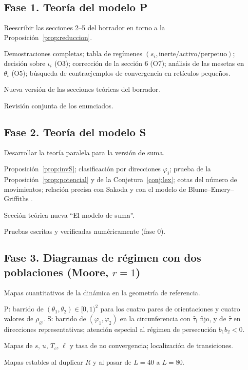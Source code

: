 \documentclass[11pt,a4paper]{article}
\theoremstyle{plain}
\theoremstyle{definition}
\theoremstyle{remark}
\newcommand{\vac}{\varnothing}
\newcommand{\modP}{\textsf{P}}
\newcommand{\modS}{\textsf{S}}
\newenvironment{fase}[1]{\subsection*{#1}\begin{description}[leftmargin=0pt,itemsep=2pt]}{\end{description}}
\begin{document}
\begin{fase}{Fase 1. Teoría del modelo \modP}
\item[Objetivo.] Reescribir las secciones 2--5 del borrador en torno a la
Proposición~\ref{prop:reduccion}.
\item[Tareas.] Demostraciones completas; tabla de regímenes
$(s_i,\text{inerte/activo/perpetuo})$; decisión sobre $\iota_i$ (O3); corrección
de la sección 6 (O7); análisis de las mesetas en $\theta_i$ (O5); búsqueda de
contraejemplos de convergencia en retículos pequeños.
\item[Entregable.] Nueva versión de las secciones teóricas del borrador.
\item[Cierre.] Revisión conjunta de los enunciados.
\end{fase}

\begin{fase}{Fase 2. Teoría del modelo \modS}
\item[Objetivo.] Desarrollar la teoría paralela para la versión de suma.
\item[Tareas.] Proposición~\ref{prop:invS}; clasificación por direcciones
$\varphi_i$; prueba de la Proposición~\ref{prop:potencial} y de la
Conjetura~\ref{conj:lex}; cotas del número de movimientos; relación precisa con
Sakoda \cite{Goles2017} y con el modelo de Blume--Emery--Griffiths
\cite{BEG1971}.
\item[Entregable.] Sección teórica nueva ``El modelo de suma''.
\item[Cierre.] Pruebas escritas y verificadas numéricamente (fase 0).
\end{fase}

\begin{fase}{Fase 3. Diagramas de régimen con dos poblaciones (Moore, $r=1$)}
\item[Objetivo.] Mapas cuantitativos de la dinámica en la geometría de
referencia.
\item[Tareas.] \modP: barrido de $(\theta_1,\theta_2)\in[0,1)^2$ para los
cuatro pares de orientaciones y cuatro valores de $\rho_\vac$. \modS: barrido de
$(\varphi_1,\varphi_2)$ en la circunferencia con $\hat\tau_i$ fijo, y de
$\hat\tau$ en direcciones representativas; atención especial al régimen de
persecución $b_1b_2<0$.
\item[Entregable.] Mapas de $s$, $u$, $T_c$, $\ell$ y tasa de no convergencia;
localización de transiciones.
\item[Cierre.] Mapas estables al duplicar $R$ y al pasar de $L=40$ a $L=80$.
\end{fase}
\end{document}
